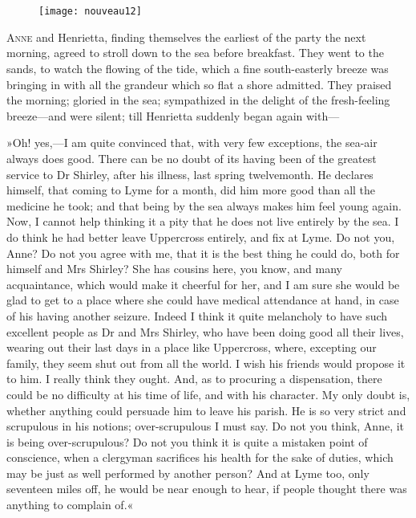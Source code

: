 \chapter[Chapter \thechapter]{}
	
	\begin{figure}[t!]
\centering
\texttt{[image: nouveau12]}
\end{figure}

\lettrine[lines=4,lraise=0.3]{A}{nne} and Henrietta, finding themselves the earliest of the party the next morning, agreed to stroll down to the sea before breakfast. They went to the sands, to watch the flowing of the tide, which a fine south-easterly breeze was bringing in with all the grandeur which so flat a shore admitted. They praised the morning; gloried in the sea; sympathized in the delight of the fresh-feeling breeze—and were silent; till Henrietta suddenly began again with—

»Oh! yes,—I am quite convinced that, with very few exceptions, the sea-air always does good. There can be no doubt of its having been of the greatest service to Dr Shirley, after his illness, last spring twelvemonth. He declares himself, that coming to Lyme for a month, did him more good than all the medicine he took; and that being by the sea always makes him feel young again. Now, I cannot help thinking it a pity that he does not live entirely by the sea. I do think he had better leave Uppercross entirely, and fix at Lyme. Do not you, Anne? Do not you agree with me, that it is the best thing he could do, both for himself and Mrs Shirley? She has cousins here, you know, and many acquaintance, which would make it cheerful for her, and I am sure she would be glad to get to a place where she could have medical attendance at hand, in case of his having another seizure. Indeed I think it quite melancholy to have such excellent people as Dr and Mrs Shirley, who have been doing good all their lives, wearing out their last days in a place like Uppercross, where, excepting our family, they seem shut out from all the world. I wish his friends would propose it to him. I really think they ought. And, as to procuring a dispensation, there could be no difficulty at his time of life, and with his character. My only doubt is, whether anything could persuade him to leave his parish. He is so very strict and scrupulous in his notions; over-scrupulous I must say. Do not you think, Anne, it is being over-scrupulous? Do not you think it is quite a mistaken point of conscience, when a clergyman sacrifices his health for the sake of duties, which may be just as well performed by another person? And at Lyme too, only seventeen miles off, he would be near enough to hear, if people thought there was anything to complain of.«

